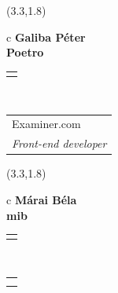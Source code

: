 \documentclass[11pt]{article}
\begin{document}
\makebox(3.3,1.8){
  \renewcommand\arraystretch{1.3}
  \begin{tabular}[c]{c}
    \hspace{8.5mm}
    \LARGE\bf{ Galiba Péter }\\
    \hspace{8.5mm}
    \Large{ Poetro }\\
    \renewcommand\arraystretch{3}
    \begin{tabular}[c]{c}
      \centering
      \fontfamily{phv}\selectfont{
        \textbf{
          \textsc{
            \scriptsize{
            \color{Bright}{ Ismerkedő }\color{Bright}{ Webmester }\color{Dark}{ Sminkmester }\color{Dark}{ Programozó }
            }
          }
        }
      }
    \end{tabular}
    \\
    \renewcommand\arraystretch{1}
    \begin{tabular}{p{3.3in}}
      \hspace{.7cm}Examiner.com\\
      \hspace{.7cm}\emph{ Front-end developer }\\
    \end{tabular}
  \end{tabular}
}

\makebox(3.3,1.8){
  \renewcommand\arraystretch{1.3}
  \begin{tabular}[c]{c}
    \hspace{8.5mm}
    \LARGE\bf{ Márai Béla }\\
    \hspace{8.5mm}
    \Large{ mib }\\
    \renewcommand\arraystretch{3}
    \begin{tabular}[c]{c}
      \centering
      \fontfamily{phv}\selectfont{
        \textbf{
          \textsc{
            \scriptsize{
            \color{Bright}{ Ismerkedő }\color{Bright}{ Webmester }\color{Bright}{ Sminkmester }\color{Dark}{ Programozó }
            }
          }
        }
      }
    \end{tabular}
    \\
    \renewcommand\arraystretch{1}
    \begin{tabular}{p{3.3in}}
      \hspace{.7cm}\\
      \hspace{.7cm}\emph{  }\\
    \end{tabular}
  \end{tabular}
}
\end{document}
